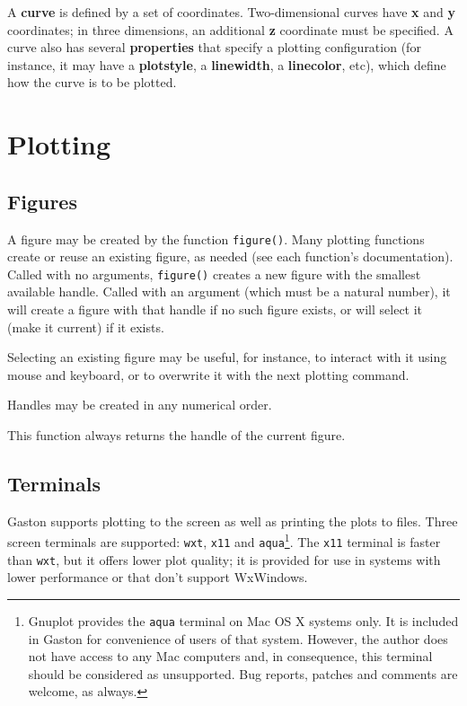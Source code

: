 \documentclass[11pt]{article}
\newcommand{\cmd}[1]{\texttt{#1}}
\begin{document}
A \textbf{curve} is defined by a set of coordinates. Two-dimensional curves
have \textbf{x} and \textbf{y} coordinates; in three dimensions, an additional
\textbf{z} coordinate must be specified. A curve also has several
\textbf{properties} that specify a plotting configuration (for instance, it may
have a \textbf{plotstyle}, a \textbf{linewidth}, a \textbf{linecolor}, etc),
which define how the curve is to be plotted.

\section{Plotting}
\label{hilevel}

\subsection{Figures}

A figure may be created by the function \cmd{figure()}. Many plotting functions
create or reuse an existing figure, as needed (see each function's
documentation). Called with no arguments, \cmd{figure()} creates a new figure
with the smallest available handle. Called with an argument (which must be a
natural number), it will create a figure with that handle if no such figure
exists, or will select it (make it current) if it exists.

Selecting an existing figure may be useful, for instance, to interact with it
using mouse and keyboard, or to overwrite it with the next plotting command.

Handles may be created in any numerical order.

This function always returns the handle of the current figure.

\subsection{Terminals}

Gaston supports plotting to the screen as well as printing the plots to files.
Three screen terminals are supported: \cmd{wxt}, \cmd{x11} and
\cmd{aqua}\footnote{Gnuplot provides the \cmd{aqua} terminal on Mac OS X
systems only. It is included in Gaston for convenience of users of that system.
However, the author does not have access to any Mac computers and, in
consequence, this terminal should be considered as unsupported. Bug reports,
patches and comments are welcome, as always.}. The \cmd{x11} terminal is faster
than \cmd{wxt}, but it offers lower plot quality; it is provided for use in
systems with lower performance or that don't support WxWindows.
\end{document}
